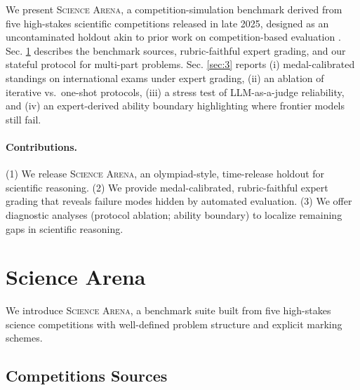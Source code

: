 \documentclass[11pt]{article}
\begin{document}
We present \textsc{Science Arena}, a competition-simulation benchmark derived from five high-stakes scientific competitions released in late 2025, designed as an uncontaminated holdout akin to prior work on competition-based evaluation \citep{balunovic2025matharena}.
Sec. \ref{sec:2} describes the benchmark sources, rubric-faithful expert grading, and our stateful protocol for multi-part problems.
Sec. \ref{sec:3} reports (i) medal-calibrated standings on international exams under expert grading, (ii) an ablation of iterative vs.\ one-shot protocols, (iii) a stress test of LLM-as-a-judge reliability, and (iv) an expert-derived ability boundary highlighting where frontier models still fail.

\paragraph{Contributions.}
(1) We release \textsc{Science Arena}, an olympiad-style, time-release holdout for scientific reasoning.
(2) We provide medal-calibrated, rubric-faithful expert grading that reveals failure modes hidden by automated evaluation.
(3) We offer diagnostic analyses (protocol ablation; ability boundary) to localize remaining gaps in scientific reasoning.





\section{Science Arena}\label{sec:2}
We introduce \textsc{Science Arena}, a benchmark suite built from five high-stakes science competitions with well-defined problem structure and explicit marking schemes.

\subsection{Competitions Sources}
\end{document}
